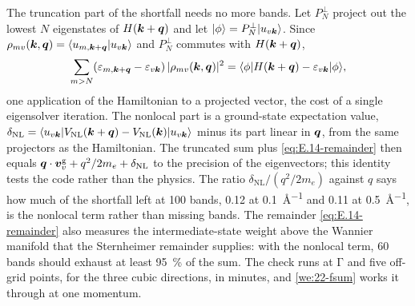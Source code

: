 The truncation part of the shortfall needs no more bands. Let $P^\perp_N$ project out the lowest $N$ eigenstates of $H(\bm{k}+\bm{q})$ and let $|\phi\rangle = P^\perp_N|u_{v\bm{k}}\rangle$. Since $\rho_{mv}(\bm{k},\bm{q}) = \langle u_{m,\bm{k}+\bm{q}}|u_{v\bm{k}}\rangle$ and $P^\perp_N$ commutes with $H(\bm{k}+\bm{q})$,
\begin{equation}
  \sum_{m>N}(\varepsilon_{m,\bm{k}+\bm{q}} - \varepsilon_{v\bm{k}})\,|\rho_{mv}(\bm{k},\bm{q})|^2 = \langle\phi|H(\bm{k}+\bm{q}) - \varepsilon_{v\bm{k}}|\phi\rangle ,
  \label{eq:E.14-remainder}
\end{equation}
one application of the Hamiltonian to a projected vector, the cost of a single eigensolver iteration. The nonlocal part is a ground-state expectation value, $\delta_{\mathrm{NL}} = \langle u_{v\bm{k}}|V_{\mathrm{NL}}(\bm{k}+\bm{q}) - V_{\mathrm{NL}}(\bm{k})|u_{v\bm{k}}\rangle$ minus its part linear in $\bm{q}$, from the same projectors as the Hamiltonian. The truncated sum plus \cref{eq:E.14-remainder} then equals $\bm{q}\cdot\bm{v}^{\mathrm{g}}_v + q^2/2m_e + \delta_{\mathrm{NL}}$ to the precision of the eigenvectors; this identity tests the code rather than the physics. The ratio $\delta_{\mathrm{NL}}/(q^2/2m_e)$ against $q$ says how much of the shortfall left at 100 bands, 0.12 at \SI{0.1}{\angstrom^{-1}} and 0.11 at \SI{0.5}{\angstrom^{-1}}, is the nonlocal term rather than missing bands. The remainder \cref{eq:E.14-remainder} also measures the intermediate-state weight above the Wannier manifold that the Sternheimer remainder supplies: with the nonlocal term, 60 bands should exhaust at least \SI{95}{\percent} of the sum. The check runs at $\mathrm{\Gamma}$ and five off-grid points, for the three cubic directions, in minutes, and \cref{we:22-fsum} works it through at one momentum.


